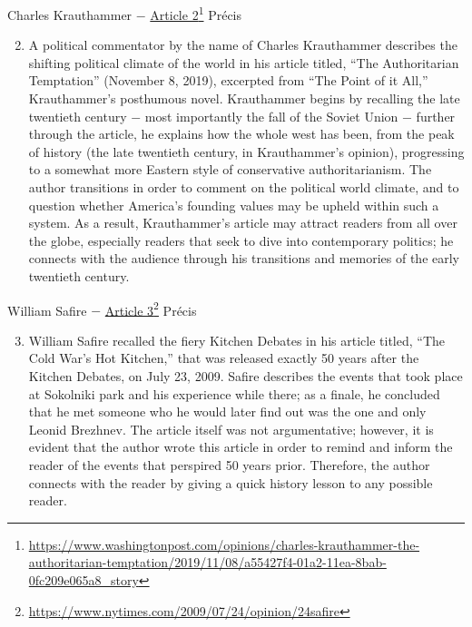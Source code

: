 \documentclass[12pt]{article}
\begin{document}
\begin{center}
Charles Krauthammer $-$ \href{https://www.washingtonpost.com/opinions/charles-krauthammer-the-authoritarian-temptation/2019/11/08/a55427f4-01a2-11ea-8bab-0fc209e065a8_story}{Article 2}\footnote{\url{https://www.washingtonpost.com/opinions/charles-krauthammer-the-authoritarian-temptation/2019/11/08/a55427f4-01a2-11ea-8bab-0fc209e065a8_story}} Pr\'ecis
\end{center}
\begin{justify}
\begin{enumerate}
    \setcounter{enumi}{1}
  \item A political commentator by the name of Charles Krauthammer describes the shifting political climate of the world in his article titled, ``The Authoritarian Temptation'' (November 8, 2019), excerpted from ``The Point of it All,'' Krauthammer's posthumous novel. Krauthammer begins by recalling the late twentieth century $-$ most importantly the fall of the Soviet Union $-$ further through the article, he explains how the whole west has been, from the peak of history (the late twentieth century, in Krauthammer's opinion), progressing to a somewhat more Eastern style of conservative authoritarianism. The author transitions in order to comment on the political world climate, and to question whether America's founding values may be upheld within such a system. As a result, Krauthammer's article may attract readers from all over the globe, especially readers that seek to dive into contemporary politics; he connects with the audience through his transitions and memories of the early twentieth century. 

\end{enumerate}
\end{justify}
\newpage

\begin{center}
William Safire $-$ \href{https://www.nytimes.com/2009/07/24/opinion/24safire}{Article 3}\footnote{\url{https://www.nytimes.com/2009/07/24/opinion/24safire}} Pr\'ecis
\end{center}
\begin{justify}
\begin{enumerate}
    \setcounter{enumi}{2}

  \item William Safire recalled the fiery Kitchen Debates in his article titled, ``The Cold War's Hot Kitchen,'' that was released exactly 50 years after the Kitchen Debates, on July 23, 2009. Safire describes the events that took place at Sokolniki park and his experience while there; as a finale, he concluded that he met someone who he would later find out was the one and only Leonid Brezhnev. The article itself was not argumentative; however, it is evident that the author wrote this article in order to remind and inform the reader of the events that perspired 50 years prior. Therefore, the author connects with the reader by giving a quick history lesson to any possible reader.

\end{enumerate}
\end{justify}
\newpage
\end{document}
